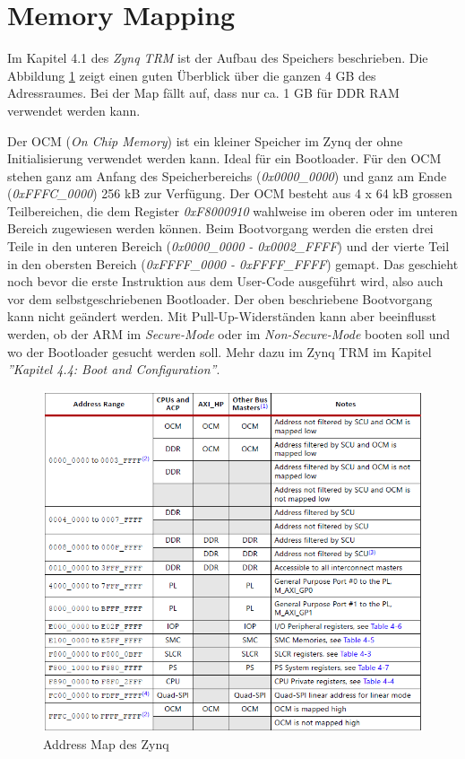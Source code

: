 


\section{Memory Mapping}
Im Kapitel 4.1 des \textit{Zynq TRM}\cite{bib:ZynqTechnicalReferenceManual} ist der Aufbau des Speichers beschrieben.
Die Abbildung \ref{fig:AddressMapZynq} zeigt einen guten Überblick über die ganzen 4 GB des Adressraumes.
Bei der Map fällt auf, dass nur ca. 1 GB für DDR RAM verwendet werden kann.

Der OCM (\textit{On Chip Memory}) ist ein kleiner Speicher im Zynq der ohne Initialisierung verwendet werden kann. 
Ideal für ein Bootloader.
Für den OCM stehen ganz am Anfang des Speicherbereichs (\textit{0x0000\_0000}) und ganz am Ende (\textit{0xFFFC\_0000}) 256 kB zur Verfügung.
Der OCM besteht aus 4 x 64 kB grossen Teilbereichen, die dem Register \textit{0xF8000910} wahlweise im oberen oder im unteren Bereich zugewiesen werden können.
Beim Bootvorgang werden die ersten drei Teile in den unteren Bereich (\textit{0x0000\_0000 - 0x0002\_FFFF}) und der vierte Teil in den obersten Bereich (\textit{0xFFFF\_0000 - 0xFFFF\_FFFF}) gemapt.
Das geschieht noch bevor die erste Instruktion aus dem User-Code ausgeführt wird, also auch vor dem selbstgeschriebenen Bootloader.
Der oben beschriebene Bootvorgang kann nicht geändert werden.
Mit Pull-Up-Widerständen kann aber beeinflusst werden, ob der ARM im \textit{Secure-Mode} oder im \textit{Non-Secure-Mode} booten soll und wo der Bootloader gesucht werden soll.
Mehr dazu im Zynq TRM\cite{bib:ZynqTechnicalReferenceManual} im Kapitel \textit{''Kapitel 4.4: Boot and Configuration''}.

\begin{figure}[htbp]
	\centering
		\includegraphics[width=14cm,height=\textheight,keepaspectratio]{images/AddressMapZynq.png}
	\caption[]{Address Map des Zynq}
	\label{fig:AddressMapZynq}
\end{figure}


